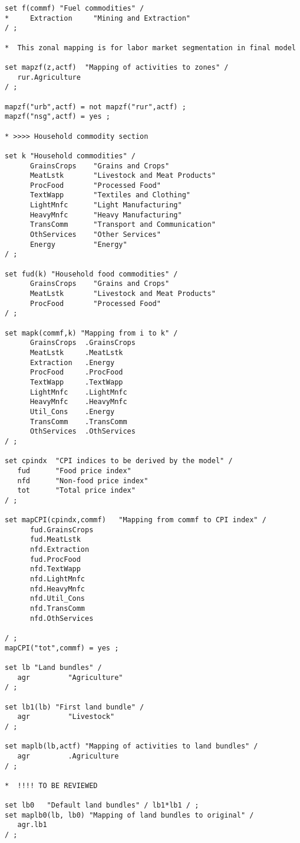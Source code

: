 \begin{lstlisting}[language=GAMS, caption={Sets for the \textsc{Envisage} Model aggregation}, label=lst:EnvSets]
set f(commf) "Fuel commodities" /
*     Extraction     "Mining and Extraction"
/ ;

*  This zonal mapping is for labor market segmentation in final model

set mapzf(z,actf)  "Mapping of activities to zones" /
   rur.Agriculture
/ ;

mapzf("urb",actf) = not mapzf("rur",actf) ;
mapzf("nsg",actf) = yes ;

* >>>> Household commodity section

set k "Household commodities" /
      GrainsCrops    "Grains and Crops"
      MeatLstk       "Livestock and Meat Products"
      ProcFood       "Processed Food"
      TextWapp       "Textiles and Clothing"
      LightMnfc      "Light Manufacturing"
      HeavyMnfc      "Heavy Manufacturing"
      TransComm      "Transport and Communication"
      OthServices    "Other Services"
      Energy         "Energy"
/ ;

set fud(k) "Household food commodities" /
      GrainsCrops    "Grains and Crops"
      MeatLstk       "Livestock and Meat Products"
      ProcFood       "Processed Food"
/ ;

set mapk(commf,k) "Mapping from i to k" /
      GrainsCrops  .GrainsCrops
      MeatLstk     .MeatLstk
      Extraction   .Energy
      ProcFood     .ProcFood
      TextWapp     .TextWapp
      LightMnfc    .LightMnfc
      HeavyMnfc    .HeavyMnfc
      Util_Cons    .Energy
      TransComm    .TransComm
      OthServices  .OthServices
/ ;

set cpindx  "CPI indices to be derived by the model" /
   fud      "Food price index"
   nfd      "Non-food price index"
   tot      "Total price index"
/ ;

set mapCPI(cpindx,commf)   "Mapping from commf to CPI index" /
      fud.GrainsCrops
      fud.MeatLstk
      nfd.Extraction
      fud.ProcFood
      nfd.TextWapp
      nfd.LightMnfc
      nfd.HeavyMnfc
      nfd.Util_Cons
      nfd.TransComm
      nfd.OthServices

/ ;
mapCPI("tot",commf) = yes ;

set lb "Land bundles" /
   agr         "Agriculture"
/ ;

set lb1(lb) "First land bundle" /
   agr         "Livestock"
/ ;

set maplb(lb,actf) "Mapping of activities to land bundles" /
   agr         .Agriculture
/ ;

*  !!!! TO BE REVIEWED

set lb0   "Default land bundles" / lb1*lb1 / ;
set maplb0(lb, lb0) "Mapping of land bundles to original" /
   agr.lb1
/ ;


\end{lstlisting}
